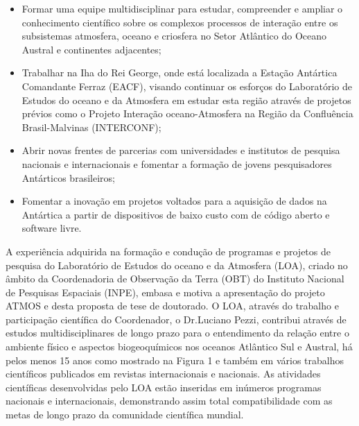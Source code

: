 \documentclass{article}
\begin{document}
\begin{itemize}
	\item Formar uma equipe multidisciplinar para estudar, compreender e ampliar o conhecimento científico 
	sobre os complexos processos de interação entre os subsistemas atmosfera, oceano e criosfera no Setor Atlântico
	do Oceano Austral e continentes adjacentes;
	\item Trabalhar na Iha do Rei George, onde está localizada a Estação Antártica Comandante Ferraz (EACF), visando 
	continuar os esforços do Laboratório de Estudos do oceano e da Atmosfera em estudar esta região através de projetos
	prévios como o Projeto Interação oceano-Atmosfera na Região da Confluência Brasil-Malvinas (INTERCONF);
	\item Abrir novas frentes de parcerias com universidades e institutos de pesquisa nacionais e internacionais e 
	fomentar a formação de jovens pesquisadores Antárticos brasileiros;
	\item Fomentar a inovação em projetos voltados para a aquisição de dados na Antártica a partir de dispositivos de baixo custo com 
	de código aberto e software livre.
\end{itemize}
\bigskip

A experiência adquirida na formação e condução de programas e projetos de pesquisa do Laboratório de Estudos  
do oceano e da Atmosfera (LOA), criado no âmbito da Coordenadoria de Observação da Terra (OBT) do Instituto
Nacional de Pesquisas Espaciais (INPE), embasa e motiva a apresentação do projeto ATMOS e desta proposta de tese de doutorado. 
O LOA, através do trabalho e participação científica do Coordenador, o Dr.Luciano Pezzi, contribui através de estudos 
multidisciplinares de longo prazo para o entendimento da relação entre o ambiente físico e aspectos biogeoquímicos nos oceanos
Atlântico Sul e Austral, há pelos menos 15 anos como mostrado na Figura 1 e também em vários trabalhos científicos publicados  
em revistas internacionais e nacionais. As atividades científicas desenvolvidas pelo LOA estão inseridas em inúmeros
programas nacionais e internacionais, demonstrando assim total compatibilidade com as metas de longo prazo da comunidade 
científica mundial. 
\end{document}
